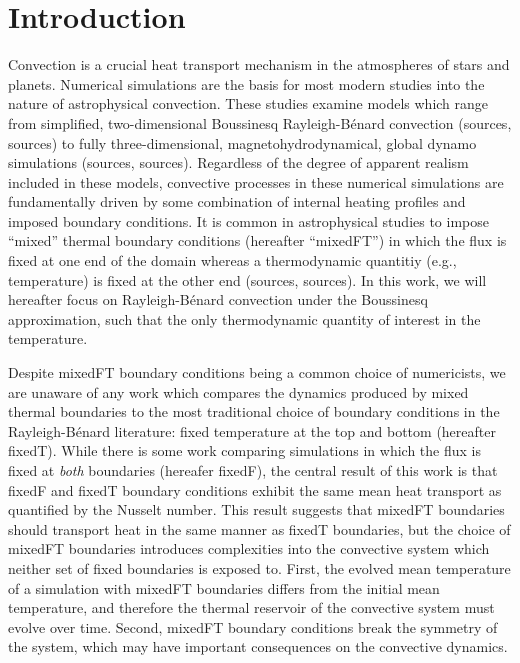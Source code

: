 \documentclass[aps, pre, onecolumn, nofootinbib, notitlepage, groupedaddress, amsfonts, amssymb, amsmath, longbibliography]{revtex4-1}
\newcommand{\RB}{Rayleigh-B\'{e}nard }
\begin{document}
\section{Introduction}
\label{sec:introduction}
Convection is a crucial heat transport mechanism in the atmospheres of stars and planets.
Numerical simulations are the basis for most modern studies into the nature of astrophysical convection.
These studies examine models which range from simplified, two-dimensional Boussinesq \RB convection (sources, sources) to fully three-dimensional, magnetohydrodynamical, global dynamo simulations (sources, sources).
Regardless of the degree of apparent realism included in these models, convective processes in these numerical simulations are fundamentally driven by some combination of internal heating profiles and imposed boundary conditions.
It is common in astrophysical studies to impose ``mixed'' thermal boundary conditions (hereafter ``mixedFT'') in which the flux is fixed at one end of the domain whereas a thermodynamic quantitiy (e.g., temperature) is fixed at the other end (sources, sources).
In this work, we will hereafter focus on \RB convection under the Boussinesq approximation, such that the only thermodynamic quantity of interest in the temperature.

Despite mixedFT boundary conditions being a common choice of numericists, we are unaware of any work which compares the dynamics produced by mixed thermal boundaries to the most traditional choice of boundary conditions in the \RB literature: fixed temperature at the top and bottom (hereafter fixedT).
While there is some work \cite{johnston&doering2009} comparing simulations in which the flux is fixed at \emph{both} boundaries (hereafer fixedF), the central result of this work is that fixedF and fixedT boundary conditions exhibit the same mean heat transport as quantified by the Nusselt number.
This result suggests that mixedFT boundaries should transport heat in the same manner as fixedT boundaries, but the choice of mixedFT boundaries introduces complexities into the convective system which neither set of fixed boundaries is exposed to.
First, the evolved mean temperature of a simulation with mixedFT boundaries differs from the initial mean temperature, and therefore the thermal reservoir of the convective system must evolve over time.
Second, mixedFT boundary conditions break the symmetry of the system, which may have important consequences on the convective dynamics.
\end{document}

